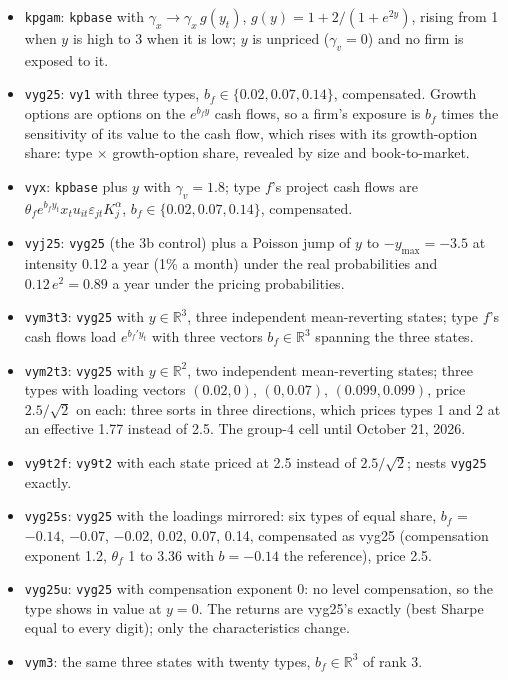 \documentclass[11pt]{article}
\begin{document}
\begin{itemize}
\item \texttt{kpgam}: \texttt{kpbase} with $\gamma_x\to\gamma_x\,g(y_t)$, $g(y)=1+2/(1+e^{2y})$, rising from 1 when $y$ is high to 3 when it is low; $y$ is unpriced ($\gamma_v=0$) and no firm is exposed to it.
\item \texttt{vyg25}: \texttt{vy1} with three types, $b_f\in\{0.02,0.07,0.14\}$, compensated. Growth options are options on the $e^{b_f y}$ cash flows, so a firm's exposure is $b_f$ times the sensitivity of its value to the cash flow, which rises with its growth-option share: type $\times$ growth-option share, revealed by size and book-to-market.
\item \texttt{vyx}: \texttt{kpbase} plus $y$ with $\gamma_v=1.8$; type $f$'s project cash flows are $\theta_f e^{b_f y_t}x_t u_{it}\varepsilon_{jt}K_j^\alpha$, $b_f\in\{0.02,0.07,0.14\}$, compensated.
\item \texttt{vyj25}: \texttt{vyg25} (the 3b control) plus a Poisson jump of $y$ to $-y_{\max}=-3.5$ at intensity 0.12 a year (1\% a month) under the real probabilities and $0.12\,e^{2}=0.89$ a year under the pricing probabilities.
\item \texttt{vym3t3}: \texttt{vyg25} with $y\in\mathbb{R}^3$, three independent mean-reverting states; type $f$'s cash flows load $e^{b_f'y_t}$ with three vectors $b_f\in\mathbb{R}^3$ spanning the three states.
\item \texttt{vym2t3}: \texttt{vyg25} with $y\in\mathbb{R}^2$, two independent mean-reverting states; three types with loading vectors $(0.02,0)$, $(0,0.07)$, $(0.099,0.099)$, price $2.5/\sqrt2$ on each: three sorts in three directions, which prices types 1 and 2 at an effective 1.77 instead of 2.5. The group-4 cell until October 21, 2026.
\item \texttt{vy9t2f}: \texttt{vy9t2} with each state priced at 2.5 instead of $2.5/\sqrt2$; nests \texttt{vyg25} exactly.
\item \texttt{vyg25s}: \texttt{vyg25} with the loadings mirrored: six types of equal share, $b_f$ = $-0.14$, $-0.07$, $-0.02$, 0.02, 0.07, 0.14, compensated as vyg25 (compensation exponent 1.2, $\theta_f$ 1 to 3.36 with $b=-0.14$ the reference), price 2.5.
\item \texttt{vyg25u}: \texttt{vyg25} with compensation exponent 0: no level compensation, so the type shows in value at $y=0$. The returns are vyg25's exactly (best Sharpe equal to every digit); only the characteristics change.
\item \texttt{vym3}: the same three states with twenty types, $b_f\in\mathbb{R}^3$ of rank 3.

\end{itemize}
\end{document}
